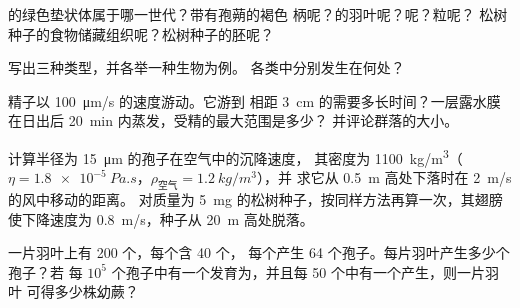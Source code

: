 \begin{exercise}[$\star$]\label{exo:b2:plant-life-cycles:3}
的绿色垫状体属于哪一世代？带有孢蒴的褐色
柄呢？的羽叶呢？呢？粒呢？
松树种子的食物储藏组织呢？松树种子的胚呢？
\end{exercise}

\begin{exercise}[$\star$]\label{exo:b2:plant-life-cycles:4}
写出三种类型，并各举一种生物为例。
各类中分别发生在何处？
\end{exercise}

\begin{exercise}[$\star\star$]\label{exo:b2:plant-life-cycles:5}
精子以 \qty{100}{\micro m/s} 的速度游动。它游到
相距 \qty{3}{cm} 的需要多长时间？一层露水膜在日出后
\qty{20}{min} 内蒸发，受精的最大范围是多少？
并评论群落的大小。
\end{exercise}

\begin{exercise}[$\star\star$]\label{exo:b2:plant-life-cycles:6}
计算半径为 \qty{15}{\micro m} 的孢子在空气中的沉降速度，
其密度为 \qty{1100}{kg/m^3}（$\eta =
\qty{1.8e-5}{Pa.s}$，$\rho_{\text{空气}} = \qty{1.2}{kg/m^3}$），并
求它从 \qty{0.5}{m} 高处下落时在 \qty{2}{m/s} 的风中移动的距离。
对质量为 \qty{5}{mg} 的松树种子，按同样方法再算一次，其翅膀
使下降速度为 \qty{0.8}{m/s}，种子从 \qty{20}{m} 高处脱落。
\end{exercise}

\begin{exercise}[$\star\star$]\label{exo:b2:plant-life-cycles:7}
一片羽叶上有 \num{200} 个，每个含 \num{40} 个，
每个产生 \num{64} 个孢子。每片羽叶产生多少个孢子？若
每 $10^{5}$ 个孢子中有一个发育为，并且每
\num{50} 个中有一个产生，则一片羽叶
可得多少株幼蕨？
\end{exercise}

